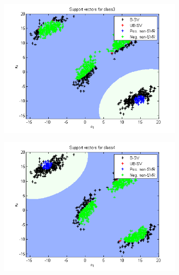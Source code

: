 \documentclass{article}
\begin{document}
\begin{figure}
\begin{subfigure}{.5\textwidth}
  \centering
  \includegraphics[width=.8\linewidth]{Classification/1a/nu_g/sv3}
 
\end{subfigure}%
\begin{subfigure}{.5\textwidth}
  \centering
  \includegraphics[width=.8\linewidth]{Classification/1a/nu_g/sv4}
  
\end{subfigure}
\end{figure}

\end{document}
